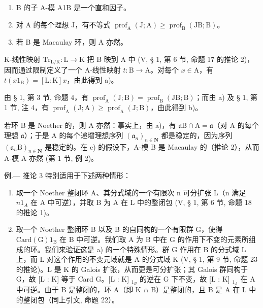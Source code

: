 \begin{enumerate}
\def\labelenumi{\alph{enumi})}
\item
  B 的子 A-模 A1B 是一个直和因子。
\item
  对 A 的每个理想 J，有不等式 \(\operatorname{prof}_{\mathrm{A}}(\mathrm{J};\mathrm{A})\geqslant\operatorname{prof}_{\mathrm{B}}(\mathrm{JB};\mathrm{B})\)。
\item
  若 B 是 Macaulay 环，则 A 亦然。
\end{enumerate}

K-线性映射 \(\mathrm{Tr}_{\mathrm{L/K}}: \mathrm{L} \to \mathrm{K}\) 把 B 映到 A 中 (V, § 1, 第 6 节, 命题 17 的推论 2)，因而通过限制定义了一个 A-线性映射 \(t: \mathrm{B} \to \mathrm{A}\)。对每个 \(x \in \mathrm{A}\)，有 \(t(x1_{\mathrm{B}}) = [\mathrm{L}: \mathrm{K}]x\)，由此得到 a)。

由 § 1, 第 3 节, 命题 4，有 \(\operatorname{prof}_{\mathrm{A}}(\mathrm{J};\mathrm{B}) = \operatorname{prof}_{\mathrm{B}}(\mathrm{JB};\mathrm{B})\)；而由 a) 及 § 1, 第 1 节, 注 4，有 \(\operatorname{prof}_{\mathrm{A}}(\mathrm{J};\mathrm{A}) \geqslant \operatorname{prof}_{\mathrm{A}}(\mathrm{J};\mathrm{B})\)，由此得到 b)。

若环 B 是 Noether 的，则 A 亦然：事实上，由 a)，有 \(\mathfrak{a}\mathrm{B} \cap \mathrm{A} = \mathfrak{a}\)（对 A 的每个理想 \(\mathfrak{a}\)）；于是 A 的每个递增理想序列 \((\mathfrak{a}_n)_{n \in \mathbf{N}}\) 都是稳定的，因为序列 \((\mathfrak{a}_n\mathrm{B})_{n \in \mathbf{N}}\) 是稳定的。在 c) 的假设下，A-模 B 是 Macaulay 的（推论 2），从而 A-模 A 亦然 (第 1 节, 例 2)。

例.--- 推论 3 特别适用于下述两种情形：

\begin{enumerate}
\def\labelenumi{\alph{enumi})}
\item
  取一个 Noether 整闭环 A、其分式域的一个有限次 n 可分扩张 L（n 满足 \(n1_{A}\) 在 A 中可逆），并取 B 为 A 在 L 中的整闭包 (V, § 1, 第 6 节, 命题 18 的推论 1)。
\item
  取一个 Noether 整闭环 B 以及 B 的自同构的一个有限群 G，使得 \(\mathrm{Card(G)1_B}\) 在 B 中可逆。我们取 A 为 B 中在 G 的作用下不变的元素所组成的环。我们来验证这是 a) 的一个特殊情形。群 G 作用在 B 的分式域 L 上，而 L 对这个作用的不变元域就是 A 的分式域 K (V, § 1, 第 9 节, 命题 23 的推论)。L 是 K 的 Galois 扩张，从而更是可分扩张；其 Galois 群同构于 G，故 {[}L : K{]} 等于 Card G。{[}L : K{]} \(_{1_{B}}\) 的逆在 G 下不变，故 {[}L : K{]} \(_{1_{A}}\) 在 A 中可逆。由于 B 是整闭的，环 A（即 K ∩ B）是整闭的，且 B 是 A 在 L 中的整闭包（同上引文, 命题 22）。
\end{enumerate}

